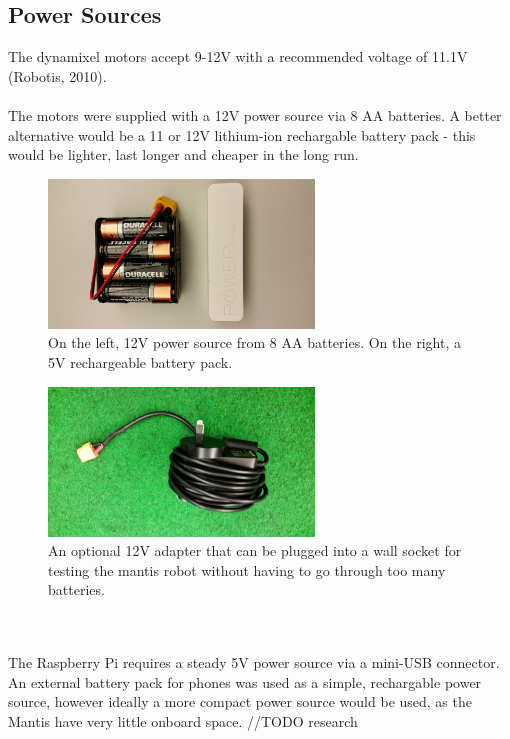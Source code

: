 \documentclass[]{article}
\begin{document}
\subsection{Power Sources}
The dynamixel motors accept 9-12V with a recommended voltage of 11.1V (Robotis, 2010).
\\
\\
The motors were supplied with a 12V power source via 8 AA batteries. A better alternative would be a 11 or 12V lithium-ion rechargable battery pack - this would be lighter, last longer and cheaper in the long run.
\begin{figure}[h]
\centering
\includegraphics[width=200pt]{report_images/power_sources.jpg}
\caption{On the left, 12V power source from 8 AA batteries. On the right, a 5V rechargeable battery pack.}
\end{figure}
\begin{figure}[h]
\centering
\includegraphics[width=200pt]{report_images/wall_power.jpg}
\caption{An optional 12V adapter that can be plugged into a wall socket for testing the mantis robot without having to go through too many batteries.}
\end{figure}
\\
\\
The Raspberry Pi requires a steady 5V power source via a mini-USB connector. An external battery pack for phones was used as a simple, rechargable power source, however ideally a more compact power source would be used, as the Mantis have very little onboard space. //TODO research
\end{document}
